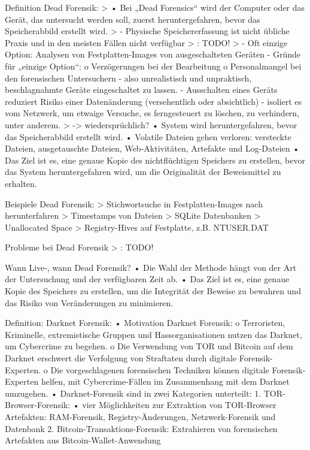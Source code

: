 Definition Dead Forensik:
	> \cite{Izzati.2022}
		•	Bei „Dead Forensics“ wird der Computer oder das Gerät, das untersucht werden soll, zuerst heruntergefahren, bevor das Speicherabbild erstellt wird.
	> \cite{Horsman.2019}
		-	Physische Speichererfassung ist nicht übliche Praxis und in den meisten Fällen nicht verfügbar
	> \cite{Hassan.2019}: TODO!
	> \cite{Mahlous.2020}
		-	Oft einzige Option: Analysen von Festplatten-Images von ausgeschalteten Geräten 
		-	Gründe für „einzige Option“:
			o	Verzögerungen bei der Bearbeitung 
			o	Personalmangel bei den forensischen Untersuchern 
		-	also unrealistisch und unpraktisch, beschlagnahmte Geräte eingeschaltet zu lassen.
		-	Ausschalten eines Geräts reduziert Risiko einer Datenänderung (versehentlich oder absichtlich) 
		-	isoliert es vom Netzwerk, um etwaige Versuche, es ferngesteuert zu löschen, zu verhindern, unter anderem.
	> \cite{Izzati.2022} -> wiedersprüchlich?
		•	System wird heruntergefahren, bevor das Speicherabbild erstellt wird.
		•	Volatile Dateien gehen verloren: versteckte Dateien, ausgetauschte Dateien, Web-Aktivitäten, Artefakte und Log-Dateien 
		•	Das Ziel ist es, eine genaue Kopie des nichtflüchtigen Speichers zu erstellen, bevor das System heruntergefahren wird, um die Originalität der Beweismittel zu erhalten.
		
Beispiele Dead Forensik:
	> Stichwortsuche in Festplatten-Images nach herunterfahren \cite{Satvat.2014}
	> Timestamps von Dateien \cite{Satvat.2014}
	> SQLite Datenbanken \cite{Satvat.2014}
	> Unallocated Space \cite{Satvat.2014}
	> Registry-Hives auf Festplatte, z.B. NTUSER.DAT \cite{Satvat.2014}
	

Probleme bei Dead Forensik 
	> \cite{Gupta.2013}: TODO!


Wann Live-, wann Dead Forensik? \cite{Izzati.2022}
	•	Die Wahl der Methode hängt von der Art der Untersuchung und der verfügbaren Zeit ab.
	•	Das Ziel ist es, eine genaue Kopie des Speichers zu erstellen, um die Integrität der Beweise zu bewahren und das Risiko von Veränderungen zu minimieren.
	
	
Definition: Darknet Forensik: \cite{Rathod.2017}
	•	Motivation Darknet Forensik:
		o	Terroristen, Kriminelle, extremistische Gruppen und Hassorganisationen nutzen das Darknet, um Cybercrime zu begehen.
		o	Die Verwendung von TOR und Bitcoin auf dem Darknet erschwert die Verfolgung von Straftaten durch digitale Forensik-Experten.
		o	Die vorgeschlagenen forensischen Techniken können digitale Forensik-Experten helfen, mit Cybercrime-Fällen im Zusammenhang mit dem Darknet umzugehen.
	•	Darknet-Forensik sind in zwei Kategorien unterteilt: 
		1.	TOR-Browser-Forensik:
		•	vier Möglichkeiten zur Extraktion von TOR-Browser Artefakten: RAM-Forensik, Registry-Änderungen, Netzwerk-Forensik und Datenbank
		2.	Bitcoin-Transaktions-Forensik: Extrahieren von forensischen Artefakten aus Bitcoin-Wallet-Anwendung
		
